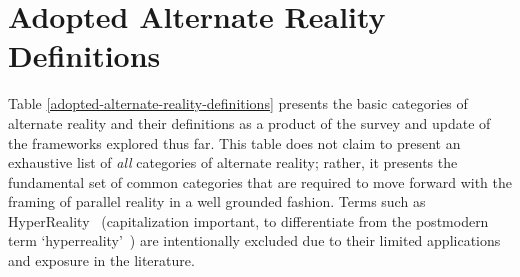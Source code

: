 \section{Adopted Alternate Reality Definitions}
\label{summaryofalternaterealitydefinitions}

Table \ref{adopted-alternate-reality-definitions} presents the basic categories of alternate reality and their definitions as a product of the survey and update of the frameworks explored thus far. This table does not claim to present an exhaustive list of \textit{all} categories of alternate reality; rather, it presents the fundamental set of common categories that are required to move forward with the framing of parallel reality in a well grounded fashion. Terms such as HyperReality~\cite{Terashima2001} (capitalization important, to differentiate from the postmodern term `hyperreality'~\cite{Baudrillard1994}) are intentionally excluded due to their limited applications and exposure in the literature.




\newpage

